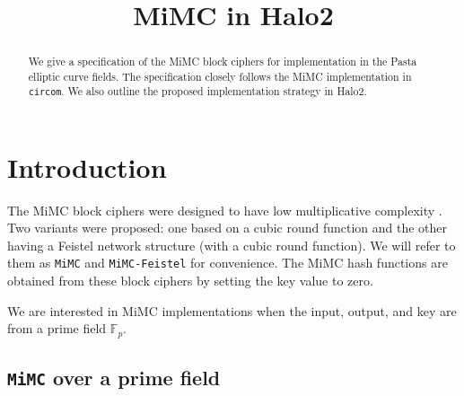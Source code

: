 \documentclass[10pt]{article}
\title{MiMC in Halo2}
\date{}
\author{}
\begin{document}
\maketitle
\begin{abstract}
  We give a specification of the MiMC block ciphers for implementation in the Pasta elliptic curve fields. The specification closely follows the MiMC implementation in \texttt{circom}. We also outline the proposed implementation strategy in Halo2.
\end{abstract}
  
\section{Introduction}%
\label{sec:introduction}
The MiMC block ciphers were designed to have low multiplicative complexity \cite{cryptoeprint:2016/492}. Two variants were proposed: one based on a cubic round function and the other having a Feistel network structure (with a cubic round function). We will refer to them as \texttt{MiMC} and \texttt{MiMC-Feistel} for convenience. The MiMC hash functions are obtained from these block ciphers by setting the key value to zero.

We are interested in MiMC implementations when the input, output, and key are from a prime field $\mathbb{F}_p$.
\subsection{\texttt{MiMC} over  a prime field}%
\label{subsec:mimc_over_a_prime_field_}
\end{document}
